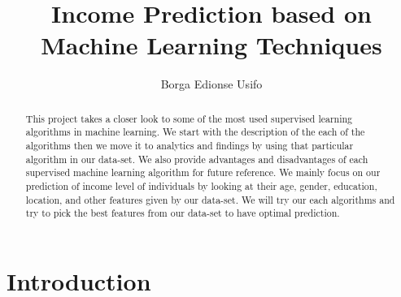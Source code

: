 \documentclass[sigconf]{acmart}
\begin{document}
\title{Income Prediction based on Machine Learning Techniques}

\author{Borga Edionse Usifo}

\renewcommand{\shortauthors}{B. Usifo et al.}

\begin{abstract}
This project takes a closer look to some of the most used supervised learning algorithms in machine learning. We start with the description of the each of the algorithms then we move it to analytics and findings by using that particular algorithm in our data-set. We also provide advantages and disadvantages of each supervised machine learning algorithm for future reference. We mainly focus on our prediction of income level of individuals by looking at their age, gender, education, location, and other features given by our data-set. We will try our each algorithms and try to pick the best features from our data-set to have optimal prediction.
\end{abstract}


\maketitle

\section{Introduction}
\end{document}
